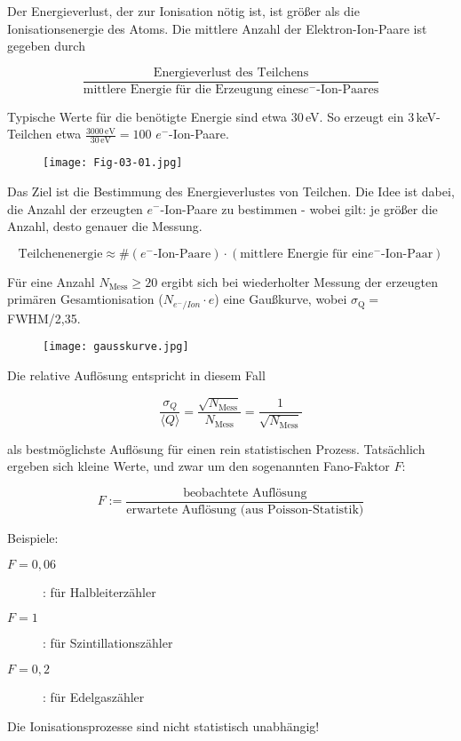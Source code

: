 Der Energieverlust, der zur Ionisation nötig ist, ist größer als die Ionisationsenergie des Atoms.
Die mittlere Anzahl der Elektron-Ion-Paare ist gegeben durch

\[\frac{\text{Energieverlust des Teilchens}}{\text{mittlere Energie für die Erzeugung eines
$e^-$-Ion-Paares}} \]

Typische Werte für die benötigte Energie sind etwa $30\,$eV. So erzeugt ein $3\,$keV-Teilchen etwa
$\frac{3000\,\text{eV}}{30\,\text{eV}}=100$ $e^-$-Ion-Paare.

\begin{figure}[H]
	\centering
	\texttt{[image: Fig-03-01.jpg]}
\end{figure}

Das Ziel ist die Bestimmung des Energieverlustes von Teilchen. Die Idee ist dabei, die Anzahl der
erzeugten $e^-$-Ion-Paare zu bestimmen - wobei gilt: je größer die Anzahl, desto genauer die
Messung.

\[\text{Teilchenenergie}\approx \#(\text{$e^-$-Ion-Paare})\cdot (\text{mittlere Energie für ein
$e^-$-Ion-Paar})\]

Für eine Anzahl $N_{\text{Mess}}\ge 20$ ergibt sich bei wiederholter Messung der erzeugten primären
Gesamtionisation ($N_{e^-/Ion}\cdot e$) eine Gaußkurve, wobei $\sigma_{\text{Q}}=$FWHM/2,35.

\begin{figure}[H]
	\centering
	\texttt{[image: gausskurve.jpg]}
\end{figure}

Die relative Auflösung entspricht in diesem Fall

\[\frac{\sigma_{Q}}{\langle Q \rangle} =
\frac{\sqrt{N_{\text{Mess}}}}{N_{\text{Mess}}}=\frac{1}{\sqrt{N_{\text{Mess}}}}
\]

als bestmöglichste Auflösung für einen rein statistischen Prozess. Tatsächlich ergeben sich kleine
Werte, und zwar um den sogenannten Fano-Faktor $F$:

\[ F:=\frac{\text{beobachtete Auflösung}}{\text{erwartete Auflösung (aus Poisson-Statistik)}} \]

Beispiele:

\begin{description}
\item[$F=0{,}06$]: für Halbleiterzähler
\item[$F=1$]: für Szintillationszähler
\item[$F=0{,}2$]: für Edelgaszähler
\end{description}

Die Ionisationsprozesse sind nicht statistisch unabhängig!

